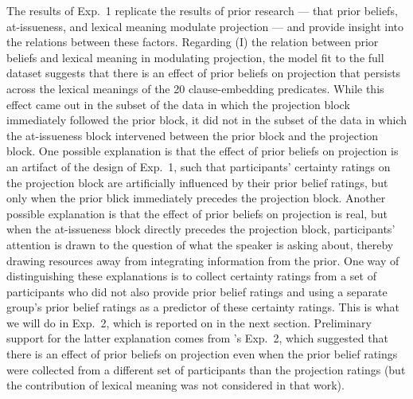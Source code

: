 \documentclass[11pt,fleqn]{article}
\newcommand{\6}{\mbox{$[\hspace*{-.6mm}[$}}
\newcommand{\9}{\mbox{$]\hspace*{-.6mm}]$}}
\newcommand{\citepos}[1]{\citeauthor{#1}'s \citeyear{#1}}
\begin{document}
The results of Exp.~1 replicate the results of prior research --- that prior beliefs, at-issueness, and lexical meaning modulate projection --- and provide insight into the relations between these factors. Regarding (I) the relation between prior beliefs and lexical meaning in modulating projection, the model fit to the full dataset suggests that there is an effect of prior beliefs on projection that persists across the lexical meanings of the 20 clause-embedding predicates. While this effect came out in the subset of the data in which the projection block immediately followed the prior block, it did not in the subset of the data in which the at-issueness block intervened between the prior block and the projection block. One possible explanation is that the effect of prior beliefs on projection is an artifact of the design of Exp.~1, such that participants' certainty ratings on the projection block are artificially influenced by their prior belief ratings, but only when the prior blick immediately precedes the projection block. Another possible explanation is that the effect of prior beliefs on projection is real, but when the at-issueness block directly precedes the projection block, participants' attention is drawn to the question of what the speaker is asking about, thereby drawing resources away from integrating information from the prior. One way of distinguishing these explanations is to collect certainty ratings from a set of participants who did not also provide prior belief ratings and using a separate group's prior belief ratings as a predictor of these certainty ratings. This is what we will do in Exp.~2, which is reported on in the next section. Preliminary support for the latter explanation comes from \citepos{degen-tonhauser-openmind} Exp.~2, which suggested that there is an effect of prior beliefs on projection even when the prior belief ratings were collected from a different set of participants than the projection ratings (but the contribution of lexical meaning was not considered in that work).
\end{document}
